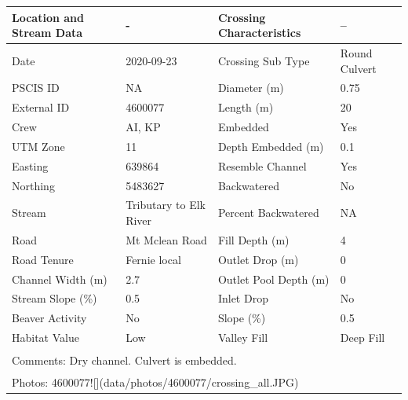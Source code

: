 \documentclass[
]{book}
\begin{document}
\begin{tabular}{llll}
\toprule
Location and Stream Data & - & Crossing Characteristics & --\\
\midrule
Date & 2020-09-23 & Crossing Sub Type & Round Culvert\\
PSCIS ID & NA & Diameter (m) & 0.75\\
External ID & 4600077 & Length (m) & 20\\
Crew & AI, KP & Embedded & Yes\\
UTM Zone & 11 & Depth Embedded (m) & 0.1\\
\addlinespace
Easting & 639864 & Resemble Channel & Yes\\
Northing & 5483627 & Backwatered & No\\
Stream & Tributary to Elk River & Percent Backwatered & NA\\
Road & Mt Mclean Road & Fill Depth (m) & 4\\
Road Tenure & Fernie local & Outlet Drop (m) & 0\\
\addlinespace
Channel Width (m) & 2.7 & Outlet Pool Depth (m) & 0\\
Stream Slope (\%) & 0.5 & Inlet Drop & No\\
Beaver Activity & No & Slope (\%) & 0.5\\
Habitat Value & Low & Valley Fill & Deep Fill\\
\bottomrule
\multicolumn{4}{l}{\textsuperscript{} Comments: Dry channel. Culvert is embedded.}\\
\multicolumn{4}{l}{\textsuperscript{} Photos: 4600077![](data/photos/4600077/crossing\_all.JPG)}\\
\end{tabular}
\end{document}
